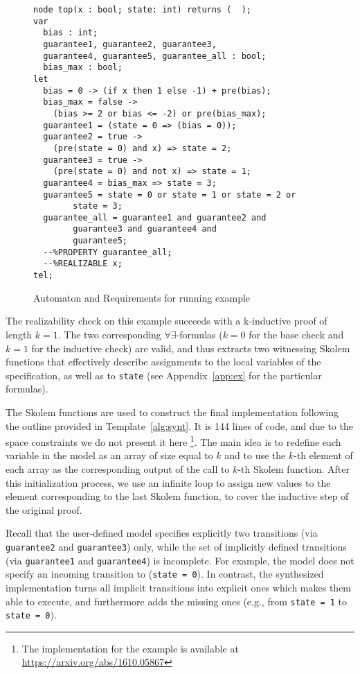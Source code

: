 \begin{figure}[tb]
\centering
{}
\begin{minipage}[c][4.5cm]{0.5\textwidth}
 \begin{Verbatim}[fontsize=\tiny]
node top(x : bool; state: int) returns (  );
var
  bias : int;
  guarantee1, guarantee2, guarantee3,
  guarantee4, guarantee5, guarantee_all : bool;
  bias_max : bool;
let
  bias = 0 -> (if x then 1 else -1) + pre(bias);
  bias_max = false ->
	(bias >= 2 or bias <= -2) or pre(bias_max);
  guarantee1 = (state = 0 => (bias = 0));
  guarantee2 = true ->
  	(pre(state = 0) and x) => state = 2;
  guarantee3 = true ->
  	(pre(state = 0) and not x) => state = 1;
  guarantee4 = bias_max => state = 3;
  guarantee5 = state = 0 or state = 1 or state = 2 or 
  		state = 3;
  guarantee_all = guarantee1 and guarantee2 and
  		guarantee3 and guarantee4 and 
  		guarantee5;
  --%PROPERTY guarantee_all;
  --%REALIZABLE x;
tel;
 \end{Verbatim}
\end{minipage}
\caption{Automaton and Requirements for running example}
\label{fg:example}
\end{figure}

The realizability check on this example succeeds with a k-inductive
proof of length $k = 1$. The two corresponding
$\forall\exists$-formulas ($k=0$ for the base check and $k=1$ for the
inductive check) are valid, and thus \aeval extracts two witnessing
Skolem functions that effectively describe assignments to the local
variables of the specification, as well as to \texttt{state} (see
Appendix~\ref{app:ex} for the particular formulas).

The Skolem functions are used to construct the final implementation
following the outline provided in Template~\ref{alg:synt}. 
It is 144 lines of code, and due to the space constraints we do not
present it here%
\footnote{The implementation for the
example is available at \url{https://arxiv.org/abs/1610.05867}}.
The main idea is to redefine each variable in the model
as an array of size equal to $k$ and
to use the $k$-th element of each array as the corresponding output of the call
to $k$-th Skolem function. After this initialization process, we use an infinite
loop to assign new values to the element corresponding to the last Skolem
function, to cover the inductive step of the original proof.

Recall that the user-defined model specifies explicitly two transitions (via \texttt{guarantee2} and \texttt{guarantee3}) only, while the set of implicitly defined transitions (via \texttt{guarantee1} and \texttt{guarantee4}) is incomplete.
For example, the model does not specify an incoming transition to (\texttt{state = 0}).
In contrast, the synthesized implementation turns all implicit transitions into explicit ones which makes them able to execute, and furthermore adds the missing ones (e.g., from \texttt{state = 1} to \texttt{state = 0}).


